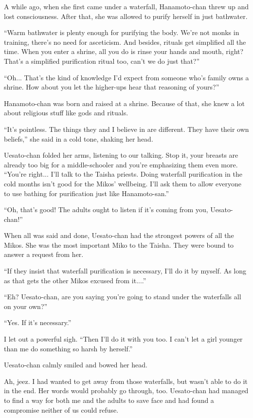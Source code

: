 A while ago, when she first came under a waterfall, Hanamoto-chan threw up and lost consciousness. After that, she was allowed to purify herself in just bathwater.

``Warm bathwater is plenty enough for purifying the body. We're not monks in training, there's no need for asceticism. And besides, rituals get simplified all the time. When you enter a shrine, all you do is rinse your hands and mouth, right? That's a simplified purification ritual too, can't we do just that?''

``Oh... That's the kind of knowledge I'd expect from someone who's family owns a shrine. How about you let the higher-ups hear that reasoning of yours?''

Hanamoto-chan was born and raised at a shrine. Because of that, she knew a lot about religious stuff like gods and rituals.

``It's pointless. The things they and I believe in are different. They have their own beliefs,'' she said in a cold tone, shaking her head.

Uesato-chan folded her arms, listening to our talking. Stop it, your breasts are already too big for a middle-schooler and you're emphasizing them even more.  ``You're right... I'll talk to the Taisha priests. Doing waterfall purification in the cold months isn't good for the Mikos' wellbeing. I'll ask them to allow everyone to use bathing for purification just like Hanamoto-san.''

``Oh, that's good! The adults ought to listen if it's coming from you, Uesato-chan!''

When all was said and done, Uesato-chan had the strongest powers of all the Mikos. She was the most important Miko to the Taisha. They were bound to answer a request from her.

``If they insist that waterfall purification is necessary, I'll do it by myself. As long as that gets the other Mikos excused from it....''

``Eh? Uesato-chan, are you saying you're going to stand under the waterfalls all on your own?''

``Yes. If it's necessary.''

I let out a powerful sigh.  ``Then I'll do it with you too. I can't let a girl younger than me do something so harsh by herself.''

Uesato-chan calmly smiled and bowed her head.

Ah, jeez. I had wanted to get away from those waterfalls, but wasn't able to do it in the end. Her words would probably go through, too. Uesato-chan had managed to find a way for both me and the adults to save face and had found a compromise neither of us could refuse.

